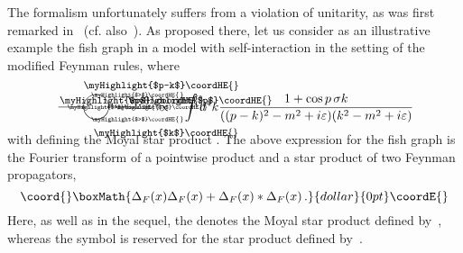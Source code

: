 \documentclass[a4paper,twoside,12pt]{article}
\begin{document}
The formalism unfortunately suffers from a violation of unitarity, as was first
remarked in~\cite{gomis} (cf. also~\cite{alvarez,luk}). As proposed 
there, let us consider as an illustrative example the fish graph
in a model with \coordHE{} self-interaction in the setting of the modified
Feynman rules, where
$$
\begin{picture}(70,23)(-3,10)
\put(00,13){\line(3,0){20}}
\put(20,13){\circle{2}}
\put(40,13){\circle{2}}
\put(40,13){\line(3,0){20}}
\put(30,13){\circle{20}}
\put(1,16){\footnotesize{\myHighlight{$p$}\coordHE{}}}
\put(20,28){\footnotesize{\myHighlight{$p-k$}\coordHE{}}}
\put(28,-10){\footnotesize{\myHighlight{$k$}\coordHE{}}}
\put(55,16){\footnotesize{\myHighlight{$p$}\coordHE{}}}
\put(7,11.5){\tiny{\myHighlight{$>$}\coordHE{}}}
\put(45,11.5){\tiny{\myHighlight{$>$}\coordHE{}}}
\put(26,21.25){\tiny{\myHighlight{$>$}\coordHE{}}}
\put(26,1.75){\tiny{\myHighlight{$>$}\coordHE{}}}
\end{picture}
\quad\propto\quad 
\int d^4k \frac{1+\cos p \,\sigma
k}{((p-k)^2-m^2+i\varepsilon)(k^2-m^2+i\varepsilon)}
$$
with \coordHE{}
defining the Moyal star product \coordHE{}. 
The above expression for the fish graph is the Fourier transform of a pointwise
product and a star product of two Feynman propagators,
$$\coord{}\boxMath{
\Delta_F(x)\Delta_F(x)+
\Delta_F(x)*\Delta_F(x)\,.
}{dollar}{0pt}\coordE{}$$
Here, as well as in the sequel,
the \myHighlight{$*$}\coordHE{} denotes the Moyal star product defined by~\myHighlight{$2\sigma$}\coordHE{}, whereas the
symbol \myHighlight{$*_\sigma$}\coordHE{} is reserved for the star product defined by~\myHighlight{$\sigma$}\coordHE{}.
\end{document}
